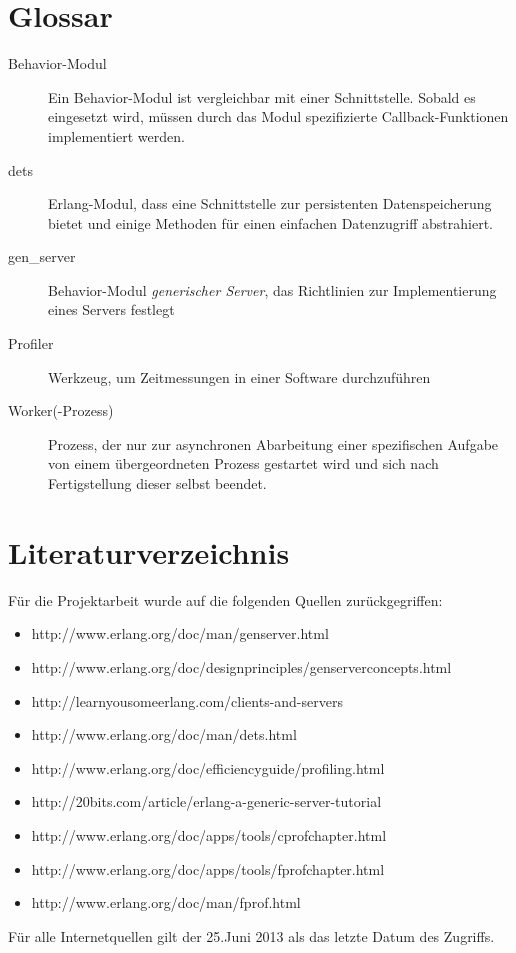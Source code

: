 \documentclass[10pt,a4paper]{article}
\begin{document}
\section{Glossar}
\begin{description}
	\item[Behavior-Modul] Ein Behavior-Modul ist vergleichbar mit einer Schnittstelle. Sobald es eingesetzt wird, müssen durch das Modul spezifizierte Callback-Funktionen implementiert werden.
	\item[dets] Erlang-Modul, dass eine Schnittstelle zur persistenten Datenspeicherung bietet und einige Methoden für einen einfachen Datenzugriff abstrahiert.
	\item[gen\_server] Behavior-Modul \textit{generischer Server}, das Richtlinien zur Implementierung eines Servers festlegt
	\item[Profiler] Werkzeug, um Zeitmessungen in einer Software durchzuführen
	\item[Worker(-Prozess)] Prozess, der nur zur asynchronen Abarbeitung einer spezifischen Aufgabe von einem übergeordneten Prozess gestartet wird und sich nach Fertigstellung dieser selbst beendet.
\end{description}
\section{Literaturverzeichnis}
Für die Projektarbeit wurde auf die folgenden Quellen zurückgegriffen:
\begin{itemize}
\item http://www.erlang.org/doc/man/gen\textunderscore server.html 
\item http://www.erlang.org/doc/design\textunderscore principles/gen\textunderscore server\textunderscore concepts.html 
\item http://learnyousomeerlang.com/clients-and-servers  
\item http://www.erlang.org/doc/man/dets.html 
\item http://www.erlang.org/doc/efficiency\textunderscore guide/profiling.html 
\item http://20bits.com/article/erlang-a-generic-server-tutorial
\item http://www.erlang.org/doc/apps/tools/cprof\textunderscore chapter.html
\item http://www.erlang.org/doc/apps/tools/fprof\textunderscore chapter.html
\item http://www.erlang.org/doc/man/fprof.html
\end{itemize}
Für alle Internetquellen gilt der 25.Juni 2013 als das letzte Datum des Zugriffs. 
%
\end{document}
